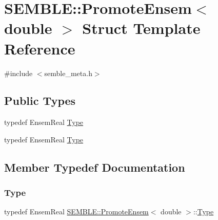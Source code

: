 \hypertarget{structSEMBLE_1_1PromoteEnsem_3_01double_01_4}{}\section{S\+E\+M\+B\+LE\+:\+:Promote\+Ensem$<$ double $>$ Struct Template Reference}
\label{structSEMBLE_1_1PromoteEnsem_3_01double_01_4}


{\ttfamily \#include $<$semble\+\_\+meta.\+h$>$}

\subsection*{Public Types}
\begin{DoxyCompactItemize}
\item 
typedef Ensem\+Real \mbox{\hyperlink{structSEMBLE_1_1PromoteEnsem_3_01double_01_4_aa25564164713a24da3902cc7c4483bf9}{Type}}
\item 
typedef Ensem\+Real \mbox{\hyperlink{structSEMBLE_1_1PromoteEnsem_3_01double_01_4_aa25564164713a24da3902cc7c4483bf9}{Type}}
\end{DoxyCompactItemize}


\subsection{Member Typedef Documentation}
\mbox{\label{structSEMBLE_1_1PromoteEnsem_3_01double_01_4_aa25564164713a24da3902cc7c4483bf9}} 
\subsubsection{\texorpdfstring{Type}{Type}\hspace{0.1cm}{\footnotesize\ttfamily [1/2]}}
{\footnotesize\ttfamily typedef Ensem\+Real \mbox{\hyperlink{structSEMBLE_1_1PromoteEnsem}{S\+E\+M\+B\+L\+E\+::\+Promote\+Ensem}}$<$ double $>$\+::\mbox{\hyperlink{structSEMBLE_1_1PromoteEnsem_3_01double_01_4_aa25564164713a24da3902cc7c4483bf9}{Type}}}

\mbox{\label{structSEMBLE_1_1PromoteEnsem_3_01double_01_4_aa25564164713a24da3902cc7c4483bf9}} 
